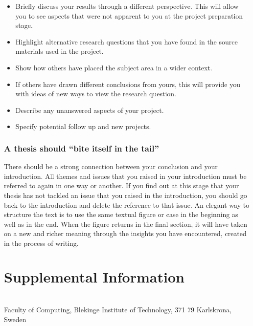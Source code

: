 \documentclass[a4paper,twoside]{bth}
\newcommand{\faculty}{Computing}
\begin{document}
\begin{itemize}
    \item Briefly discuss your results through a different perspective. This will allow you to see aspects that were not apparent to you at the project preparation stage.
    \item Highlight alternative research questions that you have found in the source materials used in the project.
    \item Show how others have placed the subject area in a wider context.
    \item If others have drawn different conclusions from yours, this will provide you with ideas of new ways to view the research question.
    \item Describe any unanswered aspects of your project.
    \item Specify potential follow up and new projects.
\end{itemize}

\subsection{A thesis should ``bite itself in the tail''}
There should be a strong connection between your conclusion and your introduction. All themes and issues that you raised in your introduction must be referred to again in one way or another. If you find out at this stage that your thesis has not tackled an issue that you raised in the introduction, you should go back to the introduction and delete the reference to that issue. An elegant way to structure the text is to use the same textual figure or case in the beginning as well as in the end. When the figure returns in the final section, it will have taken on a new and richer meaning through the insights you have encountered, created in the process of writing.

\setlength{\bibsep}{4pt}



\appendix
\chapter{Supplemental Information}


\cleardoublepage
\thispagestyle{empty}
\vspace*{\fill}
\clearpage{\thispagestyle{empty}}
\changepage{3cm}{1cm}{-0.5cm}{-0.5cm}{}{-1.5cm}{}{}{}
\vspace*{\fill}
\center

{\bthcsnotextlogo{3cm}}
\\
\noindent\makebox[\linewidth]{\rule{\textwidth}{1pt}}
Faculty of \faculty, Blekinge Institute of Technology, 371 79 Karlskrona, Sweden
\end{document}
